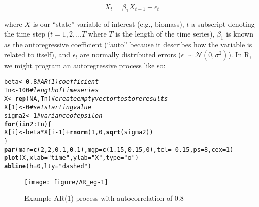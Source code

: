 \documentclass{article}\usepackage[]{graphicx}\usepackage[]{color}
\makeatletter
\newcommand{\hlnum}[1]{\textcolor[rgb]{0.686,0.059,0.569}{#1}}%
\newcommand{\hlstr}[1]{\textcolor[rgb]{0.192,0.494,0.8}{#1}}%
\newcommand{\hlcom}[1]{\textcolor[rgb]{0.678,0.584,0.686}{\textit{#1}}}%
\newcommand{\hlopt}[1]{\textcolor[rgb]{0,0,0}{#1}}%
\newcommand{\hlstd}[1]{\textcolor[rgb]{0.345,0.345,0.345}{#1}}%
\newcommand{\hlkwa}[1]{\textcolor[rgb]{0.161,0.373,0.58}{\textbf{#1}}}%
\newcommand{\hlkwb}[1]{\textcolor[rgb]{0.69,0.353,0.396}{#1}}%
\newcommand{\hlkwc}[1]{\textcolor[rgb]{0.333,0.667,0.333}{#1}}%
\newcommand{\hlkwd}[1]{\textcolor[rgb]{0.737,0.353,0.396}{\textbf{#1}}}%
\newenvironment{kframe}{%
 \def\at@end@of@kframe{}%
 \ifinner\ifhmode%
  \def\at@end@of@kframe{\end{minipage}}%
  \begin{minipage}{\columnwidth}%
 \fi\fi%
 \def\FrameCommand##1{\hskip\@totalleftmargin \hskip-\fboxsep
 \colorbox{shadecolor}{##1}\hskip-\fboxsep
     \hskip-\linewidth \hskip-\@totalleftmargin \hskip\columnwidth}%
 \MakeFramed {\advance\hsize-\width
   \@totalleftmargin\z@ \linewidth\hsize
   \@setminipage}}%
 {\par\unskip\endMakeFramed%
 \at@end@of@kframe}
\newenvironment{knitrout}{}{} %
\makeatother
\begin{document}
\begin{equation}
	X_{t}=\beta_1 X_{t-1}+\epsilon_t
\end{equation}
\par
where $X$ is our ``state'' variable of interest (e.g., biomass), $t$ a subscript denoting the time step ($t=1, 2, ... T$ where $T$ is the length of the time series), $\beta_1$ is known as the autoregressive coefficient (``auto'' because it describes how the variable is related to itself), and $\epsilon_t$ are normally distributed errors ($\epsilon~\sim \mathcal{N}(0,\sigma^2)$). In R, we might program an autoregressive process like so:
\begin{knitrout}
\color{fgcolor}\begin{kframe}
\begin{alltt}
        \hlstd{beta} \hlkwb{<-} \hlnum{0.8} \hlcom{# AR(1) coefficient}
        \hlstd{Tn} \hlkwb{<-} \hlnum{100} \hlcom{# length of time series}
        \hlstd{X} \hlkwb{<-} \hlkwd{rep}\hlstd{(}\hlnum{NA}\hlstd{, Tn)} \hlcom{# create empty vector to store results}
        \hlstd{X[}\hlnum{1}\hlstd{]} \hlkwb{<-} \hlnum{0} \hlcom{# set starting value}
        \hlstd{sigma2} \hlkwb{<-} \hlnum{1} \hlcom{# variance of epsilon}
        \hlkwa{for}\hlstd{(i} \hlkwa{in} \hlnum{2}\hlopt{:}\hlstd{Tn)\{}
                \hlstd{X[i]} \hlkwb{<-} \hlstd{beta}\hlopt{*}\hlstd{X[i}\hlopt{-}\hlnum{1}\hlstd{]} \hlopt{+} \hlkwd{rnorm}\hlstd{(}\hlnum{1}\hlstd{,} \hlnum{0}\hlstd{,} \hlkwd{sqrt}\hlstd{(sigma2))}
        \hlstd{\}}
        \hlkwd{par}\hlstd{(}\hlkwc{mar}\hlstd{=}\hlkwd{c}\hlstd{(}\hlnum{2}\hlstd{,}\hlnum{2}\hlstd{,}\hlnum{0.1}\hlstd{,}\hlnum{0.1}\hlstd{),} \hlkwc{mgp}\hlstd{=}\hlkwd{c}\hlstd{(}\hlnum{1.15}\hlstd{,} \hlnum{0.15}\hlstd{,} \hlnum{0}\hlstd{),} \hlkwc{tcl}\hlstd{=}\hlopt{-}\hlnum{0.15}\hlstd{,} \hlkwc{ps}\hlstd{=}\hlnum{8}\hlstd{,} \hlkwc{cex}\hlstd{=}\hlnum{1}\hlstd{)}
        \hlkwd{plot}\hlstd{(X,} \hlkwc{xlab}\hlstd{=}\hlstr{"time"}\hlstd{,} \hlkwc{ylab}\hlstd{=}\hlstr{"X"}\hlstd{,} \hlkwc{type}\hlstd{=}\hlstr{"o"}\hlstd{)}
        \hlkwd{abline}\hlstd{(}\hlkwc{h}\hlstd{=}\hlnum{0}\hlstd{,} \hlkwc{lty}\hlstd{=}\hlstr{"dashed"}\hlstd{)}
\end{alltt}
\end{kframe}\begin{figure}

{\centering \texttt{[image: figure/AR\_eg-1]} 

}

\caption[Example AR(1) process with autocorrelation of 0]{Example AR(1) process with autocorrelation of 0.8}\label{fig:AR_eg}
\end{figure}


\end{knitrout}
\end{document}
